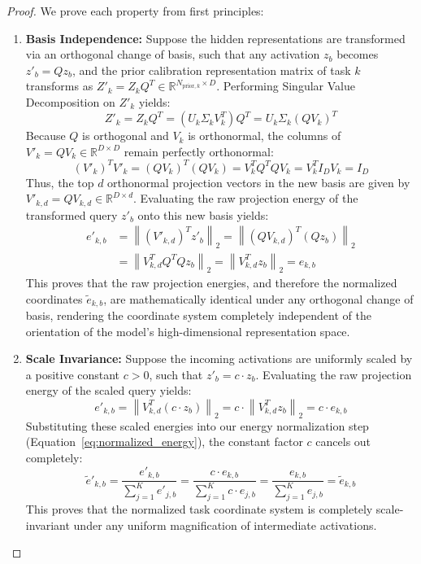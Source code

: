\begin{proof}
We prove each property from first principles:
\begin{enumerate}
    \item \textbf{Basis Independence:} Suppose the hidden representations are transformed via an orthogonal change of basis, such that any activation $z_b$ becomes $z'_b = Q z_b$, and the prior calibration representation matrix of task $k$ transforms as $Z'_k = Z_k Q^T \in \mathbb{R}^{N_{\text{prior}, k} \times D}$. Performing Singular Value Decomposition on $Z'_k$ yields:
    \begin{equation*}
        Z'_k = Z_k Q^T = (U_k \Sigma_k V_k^T) Q^T = U_k \Sigma_k (Q V_k)^T
    \end{equation*}
    Because $Q$ is orthogonal and $V_k$ is orthonormal, the columns of $V'_k = Q V_k \in \mathbb{R}^{D \times D}$ remain perfectly orthonormal:
    \begin{equation*}
        (V'_k)^T V'_k = (Q V_k)^T (Q V_k) = V_k^T Q^T Q V_k = V_k^T I_D V_k = I_D
    \end{equation*}
    Thus, the top $d$ orthonormal projection vectors in the new basis are given by $V'_{k, d} = Q V_{k, d} \in \mathbb{R}^{D \times d}$. 
    Evaluating the raw projection energy of the transformed query $z'_b$ onto this new basis yields:
    \begin{align*}
        e'_{k, b} & = \left\| (V'_{k, d})^T z'_b \right\|_2 = \left\| (Q V_{k, d})^T (Q z_b) \right\|_2 \\
        & = \left\| V_{k, d}^T Q^T Q z_b \right\|_2 = \left\| V_{k, d}^T z_b \right\|_2 = e_{k, b}
    \end{align*}
    This proves that the raw projection energies, and therefore the normalized coordinates $\tilde{e}_{k, b}$, are mathematically identical under any orthogonal change of basis, rendering the coordinate system completely independent of the orientation of the model's high-dimensional representation space.
    
    \item \textbf{Scale Invariance:} Suppose the incoming activations are uniformly scaled by a positive constant $c > 0$, such that $z'_b = c \cdot z_b$. Evaluating the raw projection energy of the scaled query yields:
    \begin{equation*}
        e'_{k, b} = \left\| V_{k, d}^T (c \cdot z_b) \right\|_2 = c \cdot \left\| V_{k, d}^T z_b \right\|_2 = c \cdot e_{k, b}
    \end{equation*}
    Substituting these scaled energies into our energy normalization step (Equation~\eqref{eq:normalized_energy}), the constant factor $c$ cancels out completely:
    \begin{equation*}
        \tilde{e}'_{k, b} = \frac{e'_{k, b}}{\sum_{j=1}^K e'_{j, b}} = \frac{c \cdot e_{k, b}}{\sum_{j=1}^K c \cdot e_{j, b}} = \frac{e_{k, b}}{\sum_{j=1}^K e_{j, b}} = \tilde{e}_{k, b}
    \end{equation*}
    This proves that the normalized task coordinate system is completely scale-invariant under any uniform magnification of intermediate activations.
\end{enumerate}
\end{proof}

